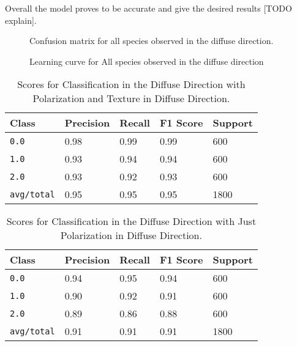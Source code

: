 Overall the model proves to be accurate and give the desired results [TODO explain].
%
\begin{figure}[!htb]
    \begin{center}
    \end{center}
    \caption{Confusion matrix for all species observed in the diffuse direction.}
    \label{fig:polarization}
\end{figure}
%
%
\begin{figure}[!htb]
    \begin{center}
    \end{center}
    \caption{Learning curve for All species observed in the diffuse direction}
    \label{fig:polarization}
\end{figure}
%
%
\begin{table}[htb]
  \centering
  \begin{tabular}{lllll}
    \toprule
    \textbf{Class} & \textbf{Precision} & \textbf{Recall} & \textbf{F1 Score} & \textbf{Support} \\
    \midrule
      \texttt{0.0} & 0.98 & 0.99 & 0.99 & 600 \\
      \texttt{1.0} & 0.93 & 0.94 & 0.94 & 600 \\
      \texttt{2.0} & 0.93 & 0.92 & 0.93 & 600 \\
      \texttt{avg/total} & 0.95 & 0.95 & 0.95 & 1800 \\
    \bottomrule
  \end{tabular}
  \caption{%
    Scores for Classification in the Diffuse Direction with Polarization and Texture in Diffuse Direction.
  }
  \label{tab:Packages}
\end{table}
\begin{table}[htb]
  \centering
  \begin{tabular}{lllll}
    \toprule
    \textbf{Class} & \textbf{Precision} & \textbf{Recall} & \textbf{F1 Score} & Support\\
    \midrule
      \texttt{0.0} & 0.94 & 0.95 & 0.94 & 600 \\
      \texttt{1.0} & 0.90 & 0.92 & 0.91 & 600 \\
      \texttt{2.0} & 0.89 & 0.86 & 0.88 & 600 \\
      \texttt{avg/total} & 0.91 & 0.91 & 0.91 & 1800 \\
    \bottomrule
  \end{tabular}
  \caption{%
    Scores for Classification in the Diffuse Direction with Just Polarization in Diffuse Direction.
  }
  \label{tab:Packages}
\end{table}
